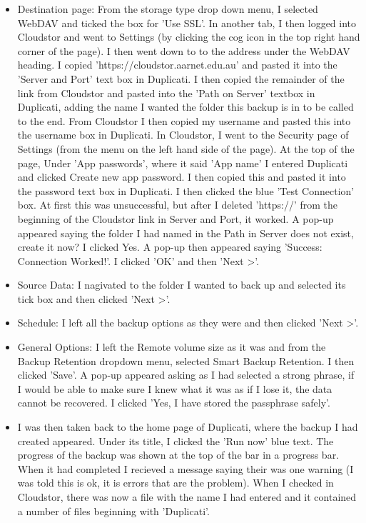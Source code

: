 \documentclass{article}
\begin{document}
\begin{FlushLeft}
\begin{itemize}
    \item Destination page: From the storage type drop down menu, I selected WebDAV and ticked the box for 'Use SSL'. In another tab, I then logged into Cloudstor and went to Settings (by clicking the cog icon in the top right hand corner of the page). I then went down to to the address under the WebDAV heading. I copied 'https://cloudstor.aarnet.edu.au' and pasted it into the 'Server and Port' text box in Duplicati. I then copied the remainder of the link from Cloudstor and pasted into the 'Path on Server' textbox in Duplicati, adding the name I wanted the folder this backup is in to be called to the end. From Cloudstor I then copied my username and pasted this into the username box in Duplicati. In Cloudstor, I went to the Security page of Settings (from the menu on the left hand side of the page). At the top of the page, Under 'App passwords', where it said 'App name' I entered Duplicati and clicked Create new app password. I then copied this and pasted it into the password text box in Duplicati. I then clicked the blue 'Test Connection' box. At first this was unsuccessful, but after I deleted 'https://' from the beginning of the Cloudstor link in Server and Port, it worked. A pop-up appeared saying the folder I had named in the Path in Server does not exist, create it now? I clicked Yes. A pop-up then appeared saying 'Success: Connection Worked!'. I clicked 'OK' and then 'Next \textgreater'.
    \item Source Data: I nagivated to the folder I wanted to back up and selected its tick box and then clicked 'Next \textgreater'.
    \item Schedule: I left all the backup options as they were and then clicked 'Next \textgreater'.
    \item General Options: I left the Remote volume size as it was and from the Backup Retention dropdown menu, selected Smart Backup Retention. I then clicked 'Save'. A pop-up appeared asking as I had selected a strong phrase, if I would be able to make sure I knew what it was as if I lose it, the data cannot be recovered. I clicked 'Yes, I have stored the passphrase safely'.
    \item I was then taken back to the home page of Duplicati, where the backup I had created appeared. Under its title, I clicked the 'Run now' blue text. The progress of the backup was shown at the top of the bar in a progress bar. When it had completed I recieved a message saying their was one warning (I was told this is ok, it is errors that are the problem). When I checked in Cloudstor, there was now a file with the name I had entered and it contained a number of files beginning with 'Duplicati'.

\end{itemize}
\end{FlushLeft}
\end{document}
